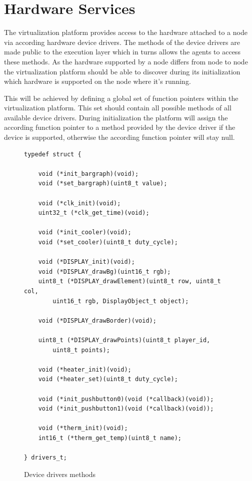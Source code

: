 \documentclass{scrreprt}
\begin{document}
\section{Hardware Services}

The virtualization platform provides access to the hardware attached to a node via according hardware 
device drivers. The methods of the device drivers are made public to the execution layer which in turns 
allows the agents to access these methods. As the hardware supported by a node differs from node to node 
the virtualization platform should be able to discover during its initialization which hardware is supported 
on the node where it’s running. 


\noindent
This will be achieved by defining a global set of function pointers within the virtualization platform. 
This set should contain all possible methods of all available device drivers. During initialization the platform 
will assign the according function pointer to a method provided by the device driver if the device is supported, 
otherwise the according function pointer will stay null. 

\begin{figure}[!htb]
\lstset{language=C}
\begin{lstlisting}[frame=single]
typedef struct {

	void (*init_bargraph)(void);
	void (*set_bargraph)(uint8_t value);

	void (*clk_init)(void);
	uint32_t (*clk_get_time)(void);

	void (*init_cooler)(void);
	void (*set_cooler)(uint8_t duty_cycle);

	void (*DISPLAY_init)(void);
	void (*DISPLAY_drawBg)(uint16_t rgb);
	uint8_t (*DISPLAY_drawElement)(uint8_t row, uint8_t col,
		uint16_t rgb, DisplayObject_t object);
	
	void (*DISPLAY_drawBorder)(void);
	
	uint8_t (*DISPLAY_drawPoints)(uint8_t player_id, 
		uint8_t points);

	void (*heater_init)(void);
	void (*heater_set)(uint8_t duty_cycle);

	void (*init_pushbutton0)(void (*callback)(void));
	void (*init_pushbutton1)(void (*callback)(void));

	void (*therm_init)(void);
	int16_t (*therm_get_temp)(uint8_t name);

} drivers_t;
\end{lstlisting}
\caption{Device drivers methods}
\label{fig:devicedrivers}
\end{figure}
\end{document}
